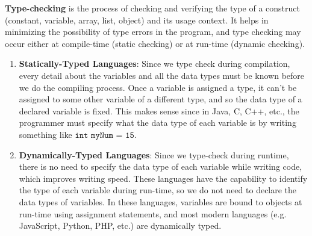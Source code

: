   \textbf{Type-checking} is the process of checking and verifying the type of a construct (constant, variable, array, list, object) and its usage context. It helps in minimizing the possibility of type errors in the program, and type checking may occur either at compile-time (static checking) or at run-time (dynamic checking). 
  \begin{enumerate}
    \item \textbf{Statically-Typed Languages}: Since we type check during compilation, every detail about the variables and all the data types must be known before we do the compiling process. Once a variable is assigned a type, it can't be assigned to some other variable of a different type, and so the data type of a declared variable is fixed. This makes sense since in Java, C, C++, etc., the programmer must specify what the data type of each variable is by writing something like $\texttt{int myNum = 15}$.

    \item \textbf{Dynamically-Typed Languages}: Since we type-check during runtime, there is no need to specify the data type of each variable while writing code, which improves writing speed. These languages have the capability to identify the type of each variable during run-time, so we do not need to declare the data types of variables. In these languages, variables are bound to objects at run-time using assignment statements, and most modern languages (e.g. JavaScript, Python, PHP, etc.) are dynamically typed.
  \end{enumerate}

